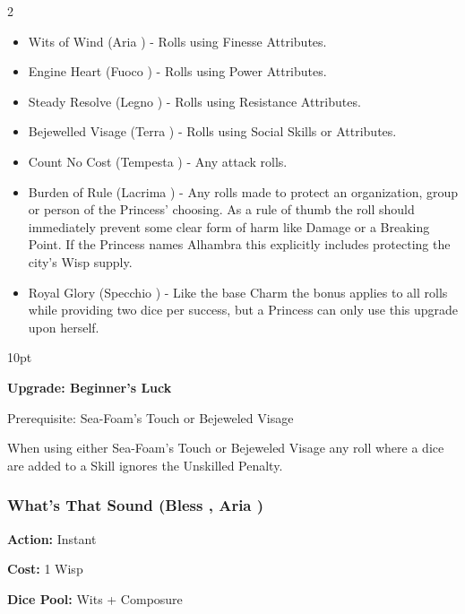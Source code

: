 \begin{multicols}{2}
\begin{itemize}
\item    Wits of Wind (Aria \textbullet) - Rolls using Finesse Attributes.

\item    Engine Heart (Fuoco \textbullet) - Rolls using  Power Attributes.

\item    Steady Resolve (Legno \textbullet) - Rolls using  Resistance Attributes.

\item    Bejewelled Visage (Terra \textbullet) - Rolls using Social Skills or Attributes.

\item    Count No Cost (Tempesta \textbullet) - Any attack rolls.

\item    Burden of Rule (Lacrima \textbullet) - Any rolls made to protect an organization, group or person of the Princess' choosing. As a rule of thumb the roll should immediately prevent some clear form of harm like Damage or a Breaking Point. If the Princess names Alhambra this explicitly includes protecting the city's Wisp supply.

\item    Royal Glory (Specchio \textbullet) - Like the base Charm the bonus applies to all rolls while providing two dice per success, but a Princess can only use this upgrade upon herself. 

 \end{itemize}
 
 \begin{myindentpar}{10pt}
 
 \textbf{Upgrade: Beginner's Luck}
 
 Prerequisite: Sea-Foam's Touch or Bejeweled Visage
 
 When using either Sea-Foam's Touch or Bejeweled Visage any roll where a dice are added to a Skill ignores the Unskilled Penalty. 
 
 \end{myindentpar}
  
\subsubsection*{What's That Sound (Bless \textbullet, Aria \textbullet)}

\noindent \textbf{Action:} Instant

\noindent \textbf{Cost:} 1 Wisp

\noindent \textbf{Dice Pool:} Wits + Composure


\end{multicols}

